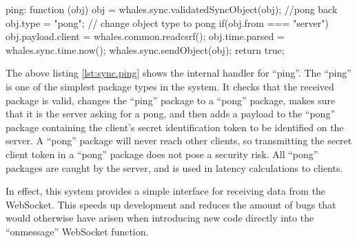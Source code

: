 \begin{snippet}[caption=An internal package handler,label=lst:sync.ping]
ping: function (obj) {
    obj = whales.sync.validatedSyncObject(obj);
    //pong back
    obj.type = "pong"; // change object type to pong
    if(obj.from === "server") {
        obj.payload.client = whales.common.readcsrf();
    }
    obj.time.parsed = whales.sync.time.now();
    whales.sync.sendObject(obj);
    return true;
}
\end{snippet}

The above listing \ref{lst:sync.ping} shows the internal handler for ``ping''.
The ``ping'' is one of the simplest package types in the system. It checks that
the received package is valid, changes the ``ping'' package to a ``pong''
package, makes sure that it is the server asking for a pong, and then
adds a payload to the ``pong'' package containing the client's secret
identification token to be identified on the server. A ``pong'' package will
never reach other clients, so transmitting the secret client token in a ``pong''
package does not pose a security risk. All ``pong'' packages are caught by the
server, and is used in latency calculations to clients.


In effect, this system provides a simple interface for receiving data from the
WebSocket. This speeds up development and reduces the amount of bugs that would
otherwise have arisen when introducing new code directly into the
``onmessage'' WebSocket function.


